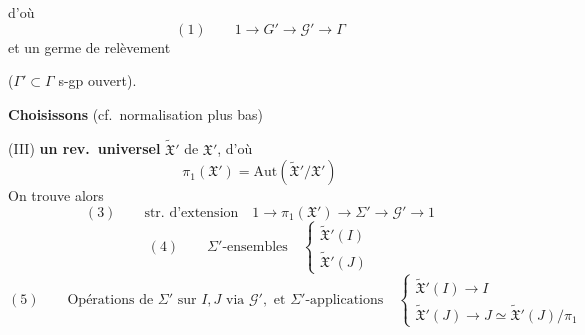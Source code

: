 \documentclass[11pt,a4paper]{article}
\begin{document}
d'où
\[
  (1)\qquad 1 \longrightarrow G' \longrightarrow \mathcal{G}' \longrightarrow \Gamma
\]
et un germe de relèvement


($\Gamma' \subset \Gamma$ s-gp ouvert).

\textbf{Choisissons} (cf.\ normalisation plus bas)

(III) \textbf{un rev.\ universel} $\widetilde{\mathfrak{X}}'$
de $\mathfrak{X}'$, d'où 
\[
  \pi_1(\mathfrak{X}') = \mathrm{Aut}(\widetilde{\mathfrak{X}}'/\mathfrak{X}')
\]
On trouve alors
\[
  (3)\qquad \text{str.\ d'extension}\quad
  1 \to \pi_1(\mathfrak{X}') \longrightarrow \Sigma' \longrightarrow
  \mathcal{G}' \to 1
\]
\[
  (4)\qquad \Sigma'\text{-ensembles}\quad \left\{
  \begin{array}{l}
    \widetilde{\mathfrak{X}}'(I) \\
    \widetilde{\mathfrak{X}}'(J)
  \end{array}\right.
\]
\[
  (5)\qquad \text{Opérations de } \Sigma' \text{ sur } I, J \text{ via }
  \mathcal{G}', \text{ et } \Sigma'\text{-applications}\quad \left\{
  \begin{array}{l}
    \widetilde{\mathfrak{X}}'(I) \to I \\
    \widetilde{\mathfrak{X}}'(J) \to J \simeq \widetilde{\mathfrak{X}}'(J)/\pi_1
  \end{array}\right.
\]
\end{document}
